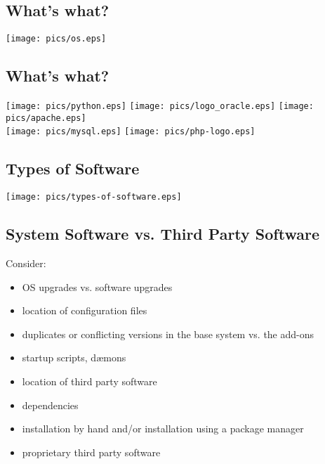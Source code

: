 \documentclass[xga]{xdvislides}
\begin{document}
\subsection{What's what?}
\begin{center}
	\texttt{[image: pics/os.eps]}
\end{center}

\subsection{What's what?}
\begin{center}
	\texttt{[image: pics/python.eps]}
	\texttt{[image: pics/logo\_oracle.eps]}
	\texttt{[image: pics/apache.eps]} \\
	\texttt{[image: pics/mysql.eps]}
	\texttt{[image: pics/php-logo.eps]}
\end{center}

\subsection{Types of Software}
\vfill
\begin{center}
	\texttt{[image: pics/types-of-software.eps]}
\end{center}
\vfill


\subsection{System Software vs. Third Party Software}
Consider:
\begin{itemize}
	\item OS upgrades vs. software upgrades
	\item location of configuration files
	\item duplicates or conflicting versions in the base system vs. the
		add-ons
	\item startup scripts, d{\ae}mons
	\item location of third party software
	\item dependencies
	\item installation by hand and/or installation using a package manager
	\item proprietary third party software
\end{itemize}
\end{document}
